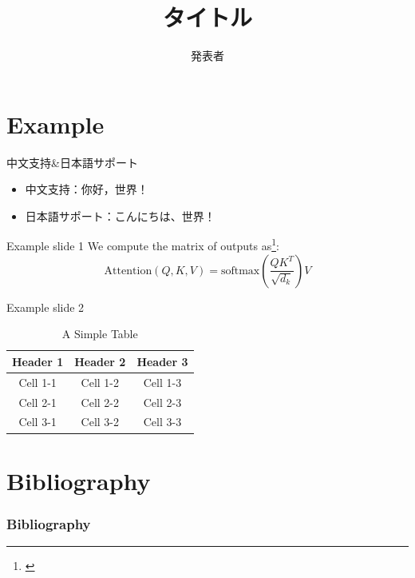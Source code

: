\documentclass[11pt]{beamer}
\author[発表者]{発表者}
\title[Short title]{タイトル}
\begin{document}
\begin{frame}
\titlepage
\end{frame}

\section{Example}

\begin{frame}{中文支持\&日本語サポート}
	\begin{itemize}
	  \item 中文支持：你好，世界！
	  \item 日本語サポート：こんにちは、世界！
	\end{itemize}
  \end{frame}

\begin{frame}{Example slide 1}
We compute the matrix of outputs as\footnote{\cite{vaswaniAttentionAllYou2023}}:
$$
	\mathrm{Attention}(Q, K, V) = \mathrm{softmax}(\frac{QK^T}{\sqrt{d_k}})V
$$
\end{frame}

\begin{frame}{Example slide 2}
	\begin{table}
	  \centering
	  \begin{tabular}{|c|c|c|}
		\hline
		\textbf{Header 1} & \textbf{Header 2} & \textbf{Header 3} \\
		\hline
		Cell 1-1 & Cell 1-2 & Cell 1-3 \\
		\hline
		Cell 2-1 & Cell 2-2 & Cell 2-3 \\
		\hline
		Cell 3-1 & Cell 3-2 & Cell 3-3 \\
		\hline
	  \end{tabular}
	  \caption{A Simple Table}
	\end{table}
\end{frame}

\section{Bibliography}

\begin{frame}[t,allowframebreaks]
\frametitle{Bibliography}
\printbibliography
\end{frame}
\end{document}
